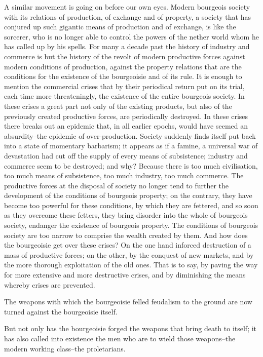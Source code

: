 \documentclass[11pt]{book}
\begin{document}
A similar movement is going on before our own eyes.  Modern
bourgeois society with its relations of production, of exchange
and of property, a society that has conjured up such gigantic
means of production and of exchange, is like the sorcerer, who is
no longer able to control the powers of the nether world whom he
has called up by his spells.  For many a decade past the history
of industry and commerce is but the history of the revolt of
modern productive forces against modern conditions of production,
against the property relations that are the conditions for the
existence of the bourgeoisie and of its rule.  It is enough to
mention the commercial crises that by their periodical return put
on its trial, each time more threateningly, the existence of the
entire bourgeois society.  In these crises a great part not only
of the existing products, but also of the previously created
productive forces, are periodically destroyed.  In these crises
there breaks out an epidemic that, in all earlier epochs, would
have seemed an absurdity--the epidemic of over-production.
Society suddenly finds itself put back into a state of momentary
barbarism; it appears as if a famine, a universal war of
devastation had cut off the supply of every means of subsistence;
industry and commerce seem to be destroyed; and why?  Because
there is too much civilisation, too much means of subsistence,
too much industry, too much commerce.  The productive forces at
the disposal of society no longer tend to further the development
of the conditions of bourgeois property; on the contrary, they
have become too powerful for these conditions, by which they are
fettered, and so soon as they overcome these fetters, they bring
disorder into the whole of bourgeois society, endanger the
existence of bourgeois property.  The conditions of bourgeois
society are too narrow to comprise the wealth created by them.
And how does the bourgeoisie get over these crises?  On the one
hand inforced destruction of a mass of productive forces; on the
other, by the conquest of new markets, and by the more thorough
exploitation of the old ones.  That is to say, by paving the
way for more extensive and more destructive crises, and by
diminishing the means whereby crises are prevented.

The weapons with which the bourgeoisie felled feudalism to the
ground are now turned against the bourgeoisie itself.

But not only has the bourgeoisie forged the weapons that bring
death to itself; it has also called into existence the men who
are to wield those weapons--the modern working class--the
proletarians.
\end{document}
